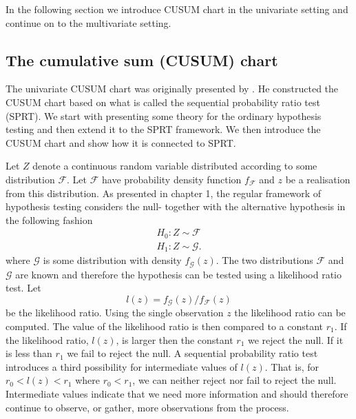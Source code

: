 In the following section we introduce CUSUM chart in the univariate setting and continue on to the multivariate setting. 
\subsection{The cumulative sum (CUSUM) chart}
The univariate CUSUM chart was originally presented by \citet{ESPAGE}. He constructed the CUSUM chart based on what is called the sequential probability ratio test (SPRT). We start with presenting some theory for the ordinary hypothesis testing and then extend it to the SPRT framework. We then introduce the CUSUM chart and show how it is connected to SPRT. 

Let $Z$ denote a continuous random variable distributed according to some distribution $\mathcal{F}$. Let $\mathcal{F}$ have probability density function $f_{\mathcal{F}}$ and $z$ be a realisation from this distribution. As presented in \citet{SeqAnalysis} chapter 1, the regular framework of hypothesis testing considers the null- together with the alternative hypothesis in the following fashion
\begin{align*}\label{nullHyp}
&H_0: Z \sim \mathcal{F}  & \\
&H_1: Z \sim \mathcal{G}. & 
\end{align*}
where $\mathcal{G}$ is some distribution with density $f_{\mathcal{G}}(z)$. The two distributions $\mathcal{F}$ and $\mathcal{G}$ are known and therefore the hypothesis can be tested using a likelihood ratio test. Let 
$$
l(z)=f_{\mathcal{G}}(z)/f_{\mathcal{F}}(z)
$$ 
be the likelihood ratio. Using the single observation $z$ the likelihood ratio can be computed. The value of the likelihood ratio is then compared to a constant $r_1$. If the likelihood ratio, $l(z)$, is larger then the constant $r_1$ we reject the null. If it is less than $r_1$ we fail to reject the null. A sequential probability ratio test introduces a third possibility for intermediate values of $l(z)$. That is, for $r_0<l(z)<r_1$ where $r_0<r_1$, we can neither reject nor fail to reject the null. Intermediate values indicate that we need more information and should therefore continue to observe, or gather, more observations from the process.


